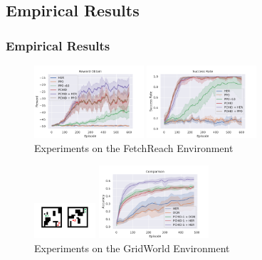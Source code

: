 \documentclass[10pt,hyperref={CJKbookmarks=true},envcountsect,mathserif]{beamer}
\begin{document}
\subsection{Empirical Results}
\begin{frame}
	\frametitle{Empirical Results}
\begin{figure}
\centering
\begin{minipage}[t]{0.5\linewidth}
			\centering
			\includegraphics[width=1.6in]{figures/FR_result.pdf}
		\end{minipage}%
		\begin{minipage}[t]{0.5\linewidth}
			\centering
			\includegraphics[width=1.6in]{figures/FR_succrate.pdf}
		\end{minipage}%

\caption{Experiments on the FetchReach Environment}
\end{figure}
	\begin{figure}
\centering
		\begin{minipage}[t]{0.5\linewidth}
			\centering
			\includegraphics[width=0.9in]{figures/dm1.pdf}
		\end{minipage}%
		\begin{minipage}[t]{0.5\linewidth}
			\centering
			\includegraphics[width=1.6in]{figures/GW_results.pdf}
		\end{minipage}%
\caption{Experiments on the GridWorld Environment}
\end{figure}
	
\end{frame}
\end{document}
